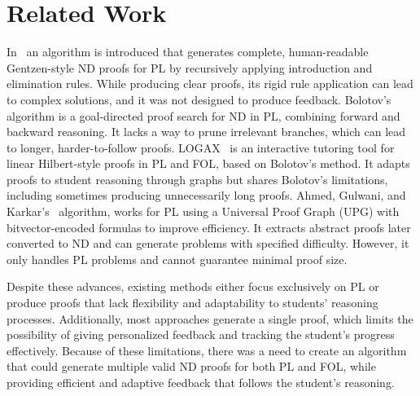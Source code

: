 \section{Related Work}
In~\cite{makahu_automatic} an algorithm is introduced that generates complete, human-readable Gentzen-style ND proofs for PL by recursively applying introduction and elimination rules. While producing clear proofs, its rigid rule application can lead to complex solutions, and it was not designed to produce feedback. Bolotov’s~\cite{bolotov_2005_automated} algorithm is a goal-directed proof search for ND in PL, combining forward and backward reasoning. It lacks a way to prune irrelevant branches, which can lead to longer, harder-to-follow proofs. LOGAX~\cite{lodder_2020_generation} is an interactive tutoring tool for linear Hilbert-style proofs in PL and FOL, based on Bolotov’s method. It adapts proofs to student reasoning through graphs but shares Bolotov’s limitations, including sometimes producing unnecessarily long proofs. Ahmed, Gulwani, and Karkar’s~\cite{IJCAI13} algorithm, works for PL using a Universal Proof Graph (UPG) with bitvector-encoded formulas to improve efficiency. It extracts abstract proofs later converted to ND and can generate problems with specified difficulty. However, it only handles PL problems and cannot guarantee minimal proof size.

Despite these advances, existing methods either focus exclusively on PL or produce proofs that lack flexibility and adaptability to students’ reasoning processes. Additionally, most approaches generate a single proof, which limits the possibility of giving personalized feedback and tracking the student’s progress effectively. Because of these limitations, there was a need to create an algorithm that could generate multiple valid ND proofs for both PL and FOL, while providing efficient and adaptive feedback that follows the student’s reasoning.


